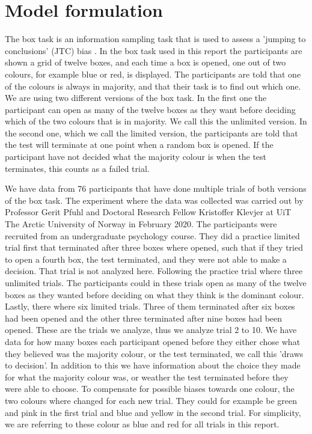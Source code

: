 \newpage
\chapter{Model formulation}
\label{Chapter_Problem_setup}
The box task is an information sampling task that is used to assess a 'jumping to conclusions' (JTC) bias \citep{balzan2017}. In the box task used in this report the participants are shown a grid of twelve boxes, and each time a box is opened, one out of two colours, for example blue or red, is displayed. The participants are told that one of the colours is always in majority, and that their task is to find out which one. We are using two different versions of the box task. In the first one the participant can open as many of the twelve boxes as they want before deciding which of the two colours that is in majority. We call this the unlimited version. In the second one, which we call the limited version, the participants are told that the test will terminate at one point when a random box is opened. If the participant have not decided what the majority colour is when the test terminates, this counts as a failed trial. 

We have data from 76 participants that have done multiple trials of both versions of the box task. The experiment where the data was collected was carried out by Professor Gerit Pfuhl and Doctoral Research Fellow Kristoffer Klevjer at UiT The Arctic University of Norway in February 2020. The participants were recruited from an undergraduate psychology course. They did a practice limited trial first that terminated after three boxes where opened, such that if they tried to open a fourth box, the test terminated, and they were not able to make a decision. That trial is not analyzed here. Following the practice trial where three unlimited trials. The participants could in these trials open as many of the twelve boxes as they wanted before deciding on what they think is the dominant colour. Lastly, there where six limited trials. Three of them terminated after six boxes had been opened and the other three terminated after nine boxes had been opened. These are the trials we analyze, thus we analyze trial 2 to 10. We have data for how many boxes each participant opened before they either chose what they believed was the majority colour, or the test terminated, we call this 'draws to decision'. In addition to this we have information about the choice they made for what the majority colour was, or weather the test terminated before they were able to choose. To compensate for possible biases towards one colour, the two colours where changed for each new trial. They could for example be green and pink in the first trial and blue and yellow in the second trial. For simplicity, we are referring to these colour as blue and red for all trials in this report.

